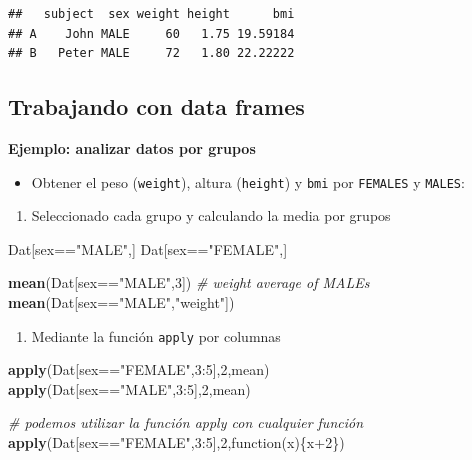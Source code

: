 \documentclass[]{article}
\def\tightlist{}
\newenvironment{Shaded}{\begin{snugshade}}{\end{snugshade}}
\newcommand{\KeywordTok}[1]{\textcolor[rgb]{0.13,0.29,0.53}{\textbf{{#1}}}}
\newcommand{\DecValTok}[1]{\textcolor[rgb]{0.00,0.00,0.81}{{#1}}}
\newcommand{\StringTok}[1]{\textcolor[rgb]{0.31,0.60,0.02}{{#1}}}
\newcommand{\CommentTok}[1]{\textcolor[rgb]{0.56,0.35,0.01}{\textit{{#1}}}}
\newcommand{\NormalTok}[1]{{#1}}
\numberwithin{equation}{section}
\begin{document}
\begin{verbatim}
##   subject  sex weight height      bmi
## A    John MALE     60   1.75 19.59184
## B   Peter MALE     72   1.80 22.22222
\end{verbatim}

\subsection{Trabajando con data
frames}\label{trabajando-con-data-frames}

\textbf{Ejemplo: analizar datos por grupos}

\begin{itemize}
\tightlist
\item
  Obtener el peso (\texttt{weight}), altura (\texttt{height}) y
  \texttt{bmi} por \texttt{FEMALES} y \texttt{MALES}:
\end{itemize}

\begin{enumerate}
\def\labelenumi{\arabic{enumi}.}
\tightlist
\item
  Seleccionado cada grupo y calculando la media por grupos
\end{enumerate}

\begin{Shaded}
\begin{Highlighting}[]
\NormalTok{Dat[sex==}\StringTok{"MALE"}\NormalTok{,]}
\NormalTok{Dat[sex==}\StringTok{"FEMALE"}\NormalTok{,]}

\KeywordTok{mean}\NormalTok{(Dat[sex==}\StringTok{"MALE"}\NormalTok{,}\DecValTok{3}\NormalTok{])  }\CommentTok{# weight average of MALEs}
\KeywordTok{mean}\NormalTok{(Dat[sex==}\StringTok{"MALE"}\NormalTok{,}\StringTok{"weight"}\NormalTok{])}
\end{Highlighting}
\end{Shaded}

\begin{enumerate}
\def\labelenumi{\arabic{enumi}.}
\setcounter{enumi}{1}
\tightlist
\item
  Mediante la función \texttt{apply} por columnas
\end{enumerate}

\begin{Shaded}
\begin{Highlighting}[]
\KeywordTok{apply}\NormalTok{(Dat[sex==}\StringTok{"FEMALE"}\NormalTok{,}\DecValTok{3}\NormalTok{:}\DecValTok{5}\NormalTok{],}\DecValTok{2}\NormalTok{,mean)}
\KeywordTok{apply}\NormalTok{(Dat[sex==}\StringTok{"MALE"}\NormalTok{,}\DecValTok{3}\NormalTok{:}\DecValTok{5}\NormalTok{],}\DecValTok{2}\NormalTok{,mean)}

\CommentTok{# podemos utilizar la función apply con cualquier función}
\KeywordTok{apply}\NormalTok{(Dat[sex==}\StringTok{"FEMALE"}\NormalTok{,}\DecValTok{3}\NormalTok{:}\DecValTok{5}\NormalTok{],}\DecValTok{2}\NormalTok{,function(x)\{x}\DecValTok{+2}\NormalTok{\})}
\end{Highlighting}
\end{Shaded}
\end{document}
